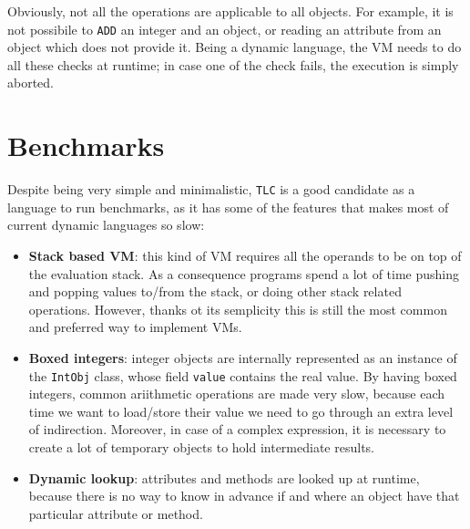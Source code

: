 Obviously, not all the operations are applicable to all objects. For example,
it is not possibile to \lstinline{ADD} an integer and an object, or reading an
attribute from an object which does not provide it.  Being a dynamic language,
the VM needs to do all these checks at runtime; in case one of the check
fails, the execution is simply aborted.


\section{Benchmarks}

Despite being very simple and minimalistic, \lstinline{TLC} is a good
candidate as a language to run benchmarks, as it has some of the features that
makes most of current dynamic languages so slow:

\begin{itemize}

\item \textbf{Stack based VM}: this kind of VM requires all the operands to be
  on top of the evaluation stack.  As a consequence programs spend a lot of
  time pushing and popping values to/from the stack, or doing other stack
  related operations.  However, thanks ot its semplicity this is still the
  most common and preferred way to implement VMs.

\item \textbf{Boxed integers}: integer objects are internally represented as
  an instance of the \lstinline{IntObj} class, whose field \lstinline{value}
  contains the real value.  By having boxed integers, common ariithmetic
  operations are made very slow, because each time we want to load/store their
  value we need to go through an extra level of indirection.  Moreover, in
  case of a complex expression, it is necessary to create a lot of temporary
  objects to hold intermediate results.

\item \textbf{Dynamic lookup}: attributes and methods are looked up at
  runtime, because there is no way to know in advance if and where an object
  have that particular attribute or method.
\end{itemize}

